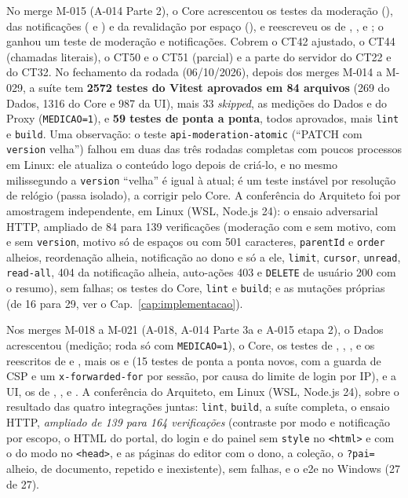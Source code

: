 No merge M-015 (A-014 Parte 2), o Core acrescentou os testes da moderação (), das notificações ( e ) e da revalidação por espaço (), e reescreveu os de , ,  e ; o   ganhou um teste de moderação e notificações. Cobrem o CT42 ajustado, o CT44 (chamadas literais), o CT50 e o CT51 (parcial) e a parte do servidor do CT22 e do CT32. No fechamento da rodada (06/10/2026), depois dos merges M-014 a M-029, a suíte tem \textbf{2572 testes do Vitest aprovados em 84 arquivos} (269 do Dados, 1316 do Core e 987 da UI), mais 33 \emph{skipped}, as medições do Dados e do Proxy (\texttt{MEDICAO=1}), e \textbf{59 testes de ponta a ponta}, todos aprovados, mais \texttt{lint} e \texttt{build}. Uma observação: o teste \texttt{api-moderation-atomic} (``PATCH com \texttt{version} velha'') falhou em duas das três rodadas completas com poucos processos em Linux: ele atualiza o conteúdo logo depois de criá-lo, e no mesmo milissegundo a \texttt{version} ``velha'' é igual à atual; é um teste instável por resolução de relógio (passa isolado), a corrigir pelo Core. A conferência do Arquiteto foi por amostragem independente, em Linux (WSL, Node.js 24): o ensaio adversarial HTTP, ampliado de 84 para 139 verificações (moderação com e sem motivo, com e sem \texttt{version}, motivo só de espaços ou com 501 caracteres, \texttt{parentId} e \texttt{order} alheios, reordenação alheia, notificação ao dono e só a ele, \texttt{limit}, \texttt{cursor}, \texttt{unread}, \texttt{read-all}, 404 da notificação alheia, auto-ações 403 e \texttt{DELETE} de usuário 200 com o resumo), sem falhas; os testes do Core, \texttt{lint} e \texttt{build}; e as mutações próprias (de 16 para 29, ver o Cap.~\ref{cap:implementacao}).

Nos merges M-018 a M-021 (A-018, A-014 Parte 3a e A-015 etapa 2), o Dados acrescentou  (medição; roda só com \texttt{MEDICAO=1}), o Core, os testes de , , ,  e os reescritos de  e , mais os   e  (15 testes de ponta a ponta novos, com a guarda de CSP e um \texttt{x-forwarded-for} por sessão, por causa do limite de login por IP), e a UI, os de , ,  e . A conferência do Arquiteto, em Linux (WSL, Node.js 24), sobre o resultado das quatro integrações juntas: \texttt{lint}, \texttt{build}, a suíte completa, o ensaio HTTP, \emph{ampliado de 139 para 164 verificações} (contraste por modo e notificação por escopo, o HTML do portal, do login e do painel sem \texttt{style} no \texttt{<html>} e com o  do modo no \texttt{<head>}, e as páginas do editor com o dono, a coleção, o \texttt{?pai=} alheio, de documento, repetido e inexistente), sem falhas, e o e2e no Windows (27 de 27).

